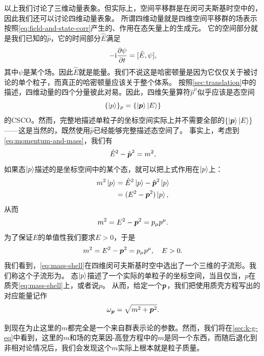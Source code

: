以上我们讨论了三维动量表象。但实际上，空间平移群是在闵可夫斯基时空中的，因此我们还可以讨论四维动量表象。
所谓四维动量就是四维空间平移群的场表示按照\eqref{eq:field-and-state-corr}产生的、作用在态矢量上的生成元。
它的空间部分就是我们已知的$\hat{p}$，它的时间部分$\hat{E}$满足
\[
    - \mathrm{i} \pdv{\psi}{t} = [\hat{E}, \psi],
\]
其中$\psi$是某个场。因此$\hat{E}$就是能量。我们不说这是哈密顿量是因为它仅仅关于被讨论的单个粒子，而真正的哈密顿量应该关于整个体系。
按照\autoref{sec:translation}中的描述，四维动量的四个分量彼此对易。因此，四维矢量算符$\hat{p}^\mu$似乎应该是态空间
\[
    \{\ket{p}\}_p = \{\ket{\vb*{p}} \ket{E}\}
\]
的CSCO。然而，完整地描述单粒子的坐标空间实际上并不需要全部的$\{\ket{\vb*{p}} \ket{E}\}$——这是当然的，既然使用$\hat{p}$已经能够完整描述态空间了。
事实上，考虑到\eqref{eq:momentum-and-mass}，我们有
\begin{equation}
    \hat{E}^2 - \hat{\vb*{p}}^2 = m^2,
\end{equation}
如果态$\ket{p}$描述的是坐标空间中的某个态，就可以把上式作用在$\ket{p}$上：
\[
    \begin{aligned}
        m^2 \ket{p} &= \hat{E}^2 \ket{p} - \hat{\vb*{p}}^2 \ket{p} \\
        &= (E^2 - \vb*{p}^2) \ket{p},
    \end{aligned}
\]
从而
\[
    m^2 = E^2 - \vb*{p}^2 = p_\mu p^\mu.
\]
为了保证$E$的单值性我们要求$E>0$，于是
\begin{equation}
    m^2 = E^2 - \vb*{p}^2 = p_\mu p^\mu, \quad E > 0.
    \label{eq:mass-shell}
\end{equation}
我们看到，\eqref{eq:mass-shell}在四维闵可夫斯基时空中选出了一个三维的子流形。我们称这个子流形为。
态$\ket{p}$描述了一个实际的单粒子的坐标空间，当且仅当，$p$在质壳\eqref{eq:mass-shell}上，或者说$p$。
从而，给定一个$\vb*{p}$，我们把使用质壳方程写出的对应能量记作
\begin{equation}
    \omega_{\vb*{p}} = \sqrt{ m^2 + \vb*{p}^2 }.
\end{equation}

到现在为止这里的$m$都完全是一个来自群表示论的参数。然而，我们将在\autoref{sec:k-g-eq}中看到，这里的$m$和场的克莱因-高登方程中的$m$是同一个东西，而随后退化到非相对论情况后，我们会发现这个$m$实际上根本就是粒子质量。

